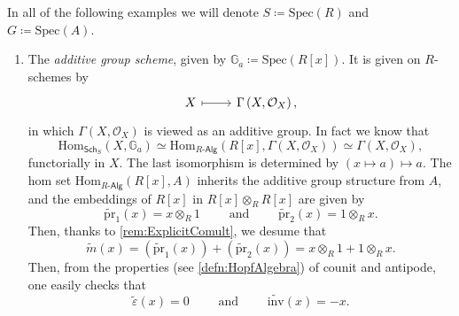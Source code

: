 \documentclass[../Main]{subfiles}
\begin{document}
\begin{ex}
	In all of the following examples we will denote $S \coloneqq \mathrm{Spec}(R)$
	and $G \coloneqq \mathrm{Spec}(A)$.\nopagebreak[4]
	\begin{enumerate}
		\item The {\em additive group scheme}, given by 
			$\mathbb{G}_a \coloneqq \mathrm{Spec}(R[x])$.
			It is given on $R$-schemes by
			\begin{equation*}
			\begin{tikzcd}[row sep = 0ex
				,/tikz/column 1/.append style={anchor=base east}
				,/tikz/column 2/.append style={anchor=base west}]
				X \arrow[r, "", mapsto] & 
				\Gamma \left( X , \mathcal{O}_{ X } \right)
			,\end{tikzcd}
			\end{equation*} 
			in which $\Gamma \left( X , \mathcal{O}_{ X } \right)$ is viewed
			as an additive group.
			In fact	we know that
			\begin{equation*}
			\mathrm{Hom}_{\mathsf{Sch}_S} \left( X, \mathbb{G}_a \right) \simeq
			\mathrm{Hom}_{R \text{-}\mathsf{Alg}} 
			\left( R[x], \Gamma \left( X , \mathcal{O}_{ X } \right) \right) \simeq
			\Gamma \left( X , \mathcal{O}_{ X } \right)
			,\end{equation*} 
			functorially in $X$.
			The last isomorphism is determined by 
			$(x \mapsto a) \mapsto a$.
			The hom set 
			$\mathrm{Hom}_{R \text{-}\mathsf{Alg}} \left( R[x], A \right)$
			inherits the additive group structure from $A$, and the embeddings
			of $R[x]$ in $R[x] \otimes_R R[x]$ are given by
			\begin{equation*}
				\widetilde{\mathrm{pr}}_1(x) = x \otimes_R 1
				\qquad \text{ and } \qquad
				\widetilde{\mathrm{pr}}_2(x) = 1 \otimes_R x
			.\end{equation*} 
			Then, thanks to \cref{rem:ExplicitComult},
			we desume that
			\begin{equation*}
				\widetilde{m}(x) =
				\left( \widetilde{\mathrm{pr}}_1(x) \right) +
				\left( \widetilde{\mathrm{pr}}_2(x) \right) =
				x \otimes_R 1 + 1 \otimes_R x
			.\end{equation*} 
			Then, from the properties (see \cref{defn:HopfAlgebra})
			of counit and antipode, one easily checks that 
			\begin{equation*}
				\widetilde{\varepsilon}(x) = 0
				\qquad \text{ and } \qquad
				\widetilde{\mathrm{inv}}(x) = -x
			.\end{equation*} 



\end{enumerate}
\end{ex}
\end{document}
